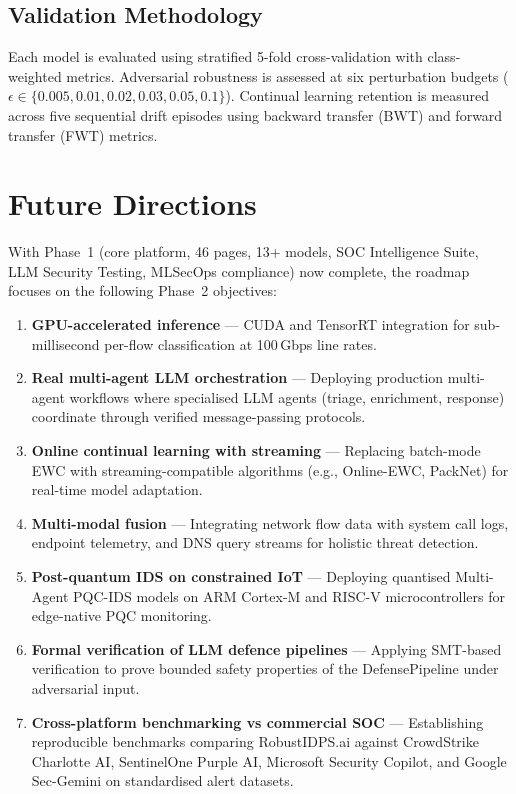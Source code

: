 \subsection{Validation Methodology}
Each model is evaluated using stratified 5-fold cross-validation with
class-weighted metrics.  Adversarial robustness is assessed at six
perturbation budgets ($\epsilon \in \{0.005, 0.01, 0.02, 0.03, 0.05, 0.1\}$).
Continual learning retention is measured across five sequential drift episodes
using backward transfer (BWT) and forward transfer (FWT) metrics.

\section{Future Directions}
\label{sec:future}

With Phase~1 (core platform, 46 pages, 13+ models, SOC Intelligence Suite,
LLM Security Testing, MLSecOps compliance) now complete, the roadmap
focuses on the following Phase~2 objectives:

\begin{enumerate}
  \item \textbf{GPU-accelerated inference} --- CUDA and TensorRT
        integration for sub-millisecond per-flow classification at
        100\,Gbps line rates.
  \item \textbf{Real multi-agent LLM orchestration} --- Deploying
        production multi-agent workflows where specialised LLM agents
        (triage, enrichment, response) coordinate through verified
        message-passing protocols.
  \item \textbf{Online continual learning with streaming} --- Replacing
        batch-mode EWC with streaming-compatible algorithms (e.g.,
        Online-EWC, PackNet) for real-time model adaptation.
  \item \textbf{Multi-modal fusion} --- Integrating network flow data
        with system call logs, endpoint telemetry, and DNS query streams
        for holistic threat detection.
  \item \textbf{Post-quantum IDS on constrained IoT} --- Deploying
        quantised Multi-Agent PQC-IDS models on ARM Cortex-M and
        RISC-V microcontrollers for edge-native PQC monitoring.
  \item \textbf{Formal verification of LLM defence pipelines} ---
        Applying SMT-based verification to prove bounded safety
        properties of the DefensePipeline under adversarial input.
  \item \textbf{Cross-platform benchmarking vs commercial SOC} ---
        Establishing reproducible benchmarks comparing RobustIDPS.ai
        against CrowdStrike Charlotte AI, SentinelOne Purple AI,
        Microsoft Security Copilot, and Google Sec-Gemini on
        standardised alert datasets.
\end{enumerate}

